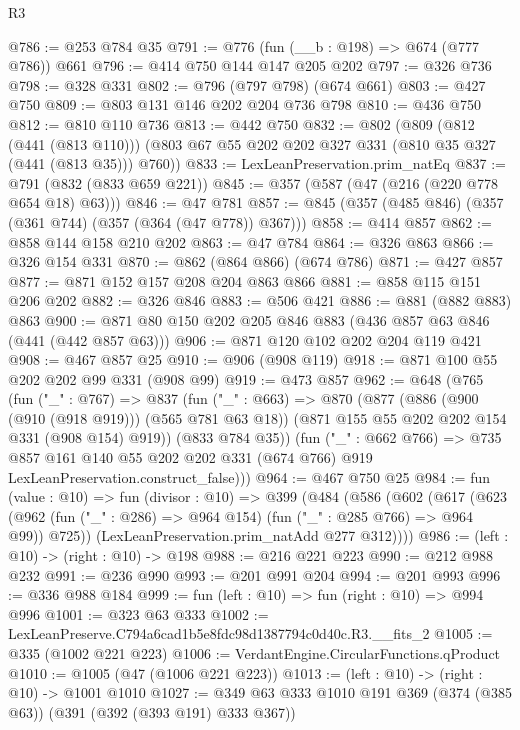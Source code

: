 \begin{lexlean}{R3}
\begin{coremodule}
@786 := @253 @784 @35
@791 := @776 (fun (__b : @198) => @674 (@777 @786)) @661
@796 := @414 @750 @144 @147 @205 @202
@797 := @326 @736
@798 := @328 @331
@802 := @796 (@797 @798) (@674 @661)
@803 := @427 @750
@809 := @803 @131 @146 @202 @204 @736 @798
@810 := @436 @750
@812 := @810 @110 @736
@813 := @442 @750
@832 := @802
    (@809
      (@812 (@441 (@813 @110)))
      (@803 @67 @55 @202 @202 @327 @331 (@810 @35 @327 (@441 (@813 @35))) @760))
@833 := LexLeanPreservation.prim_natEq
@837 := @791 (@832 (@833 @659 @221))
@845 := @357 (@587 (@47 (@216 (@220 @778 @654 @18) @63)))
@846 := @47 @781
@857 := @845 (@357 (@485 @846) (@357 (@361 @744) (@357 (@364 (@47 @778)) @367)))
@858 := @414 @857
@862 := @858 @144 @158 @210 @202
@863 := @47 @784
@864 := @326 @863
@866 := @326 @154 @331
@870 := @862 (@864 @866) (@674 @786)
@871 := @427 @857
@877 := @871 @152 @157 @208 @204 @863 @866
@881 := @858 @115 @151 @206 @202
@882 := @326 @846
@883 := @506 @421
@886 := @881 (@882 @883) @863
@900 := @871 @80 @150 @202 @205 @846 @883 (@436 @857 @63 @846 (@441 (@442 @857 @63)))
@906 := @871 @120 @102 @202 @204 @119 @421
@908 := @467 @857 @25
@910 := @906 (@908 @119)
@918 := @871 @100 @55 @202 @202 @99 @331 (@908 @99)
@919 := @473 @857
@962 := @648
    (@765
      (fun ("_" : @767) =>
      @837
        (fun ("_" : @663) =>
        @870
          (@877
            (@886 (@900 (@910 (@918 @919))) (@565 @781 @63 @18))
            (@871 @155 @55 @202 @202 @154 @331 (@908 @154) @919))
          (@833 @784 @35))
        (fun ("_" : @662 @766) =>
        @735
          @857
          @161
          @140
          @55
          @202
          @202
          @331
          (@674 @766)
          @919
          LexLeanPreservation.construct_false)))
@964 := @467 @750 @25
@984 := fun (value : @10) =>
  fun (divisor : @10) =>
  @399
    (@484
      (@586
        (@602
          (@617
            (@623 (@962 (fun ("_" : @286) => @964 @154) (fun ("_" : @285 @766) => @964 @99)) @725))
          (LexLeanPreservation.prim_natAdd @277 @312))))
@986 := (left : @10) -> (right : @10) -> @198
@988 := @216 @221 @223
@990 := @212 @988 @232
@991 := @236 @990
@993 := @201 @991 @204
@994 := @201 @993
@996 := @336 @988 @184
@999 := fun (left : @10) => fun (right : @10) => @994 @996
@1001 := @323 @63 @333
@1002 := LexLeanPreserve.C794a6cad1b5e8fdc98d1387794c0d40c.R3.__fits_2
@1005 := @335 (@1002 @221 @223)
@1006 := VerdantEngine.CircularFunctions.qProduct
@1010 := @1005 (@47 (@1006 @221 @223))
@1013 := (left : @10) -> (right : @10) -> @1001 @1010
@1027 := @349 @63 @333 @1010 @191 @369 (@374 (@385 @63)) (@391 (@392 (@393 @191) @333 @367))

\end{coremodule}
\end{lexlean}
